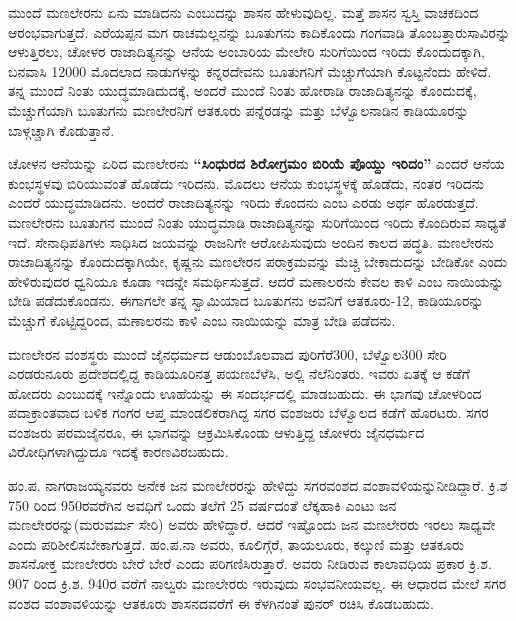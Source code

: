 ಮುಂದೆ ಮಣಲೇರನು ಏನು ಮಾಡಿದನು ಎಂಬುದನ್ನು ಶಾಸನ ಹೇಳುವುದಿಲ್ಲ. ಮತ್ತೆ ಶಾಸನ ಸ್ವಸ್ತಿ ವಾಚಕದಿಂದ ಆರಂಭವಾಗುತ್ತದೆ. ಎರೆಯಪ್ಪನ ಮಗ ರಾಚಮಲ್ಲನನ್ನು ಬೂತುಗನು ಕಾದಿಕೊಂದು ಗಂಗವಾಡಿ ತೊಂಬತ್ತಾರುಸಾವಿರನ್ನು ಆಳುತ್ತಿರಲು, ಚೋಳರ ರಾಜಾದಿತ್ಯನನ್ನು ಆನೆಯ ಅಂಬಾರಿಯ ಮೇಲೇರಿ ಸುರಿಗೆಯಿಂದ ಇರಿದು ಕೊಂದುದಕ್ಕಾಗಿ, ಬನವಾಸಿ 12000 ಮೊದಲಾದ ನಾಡುಗಳನ್ನು ಕನ್ನರದೇವನು ಬೂತುಗನಿಗೆ ಮೆಚ್ಚುಗೆಯಾಗಿ ಕೊಟ್ಟನೆಂದು ಹೇಳಿದೆ. ತನ್ನ ಮುಂದೆ ನಿಂತು ಯುದ್ಧಮಾಡಿದುದಕ್ಕೆ, ಅಂದರೆ ಮುಂದೆ ನಿಂತು ಹೋರಾಡಿ ರಾಜಾದಿತ್ಯನನ್ನು ಕೊಂದುದಕ್ಕೆ, ಮೆಚ್ಚುಗೆಯಾಗಿ ಬೂತುಗನು ಮಣಲೇರನಿಗೆ ಆತಕೂರು ಪನ್ನೆರಡನ್ನು ಮತ್ತು ಬೆಳ್ವೊಲನಾಡಿನ ಕಾಡಿಯೂರನ್ನು ಬಾಳ್ಗಚ್ಚಾಗಿ ಕೊಡುತ್ತಾನೆ.

ಚೋಳನ ಆನೆಯನ್ನು ಏರಿದ ಮಣಲೇರನು \textbf{“ಸಿಂಧುರದ ಶಿರೋಗ್ರಮಂ ಬಿರಿಯೆ ಪೊಯ್ದು ಇರಿದಂ”} ಎಂದರೆ ಆನೆಯ ಕುಂಭಸ್ಥಳವು ಬಿರಿಯುವಂತೆ ಹೊಡೆದು ಇರಿದನು. ಮೊದಲು ಆನೆಯ ಕುಂಭಸ್ಥಳಕ್ಕೆ ಹೊಡೆದು, ನಂತರ ಇರಿದನು ಎಂದರೆ ಯುದ್ಧಮಾಡಿದನು. ಅಂದರೆ ರಾಜಾದಿತ್ಯನನ್ನು ಇರಿದು ಕೊಂದನು ಎಂಬ ಎರಡು ಅರ್ಥ ಹೊರಡುತ್ತದೆ. ಮಣಲೇರನು ಬೂತುಗನ ಮುಂದೆ ನಿಂತು ಯುದ್ಧಮಾಡಿ ರಾಜಾದಿತ್ಯನನ್ನು ಸುರಿಗೆಯಿಂದ ಇರಿದು ಕೊಂದಿರುವ ಸಾಧ್ಯತೆ ಇದೆ. ಸೇನಾಧಿಪತಿಗಳು ಸಾಧಿಸಿದ ಜಯವನ್ನು ರಾಜನಿಗೇ ಆರೋಪಿಸುವುದು ಅಂದಿನ ಕಾಲದ ಪದ್ಧತಿ. ಮಣಲೇರನು ರಾಜಾದಿತ್ಯನನ್ನು ಕೊಂದುದಕ್ಕಾಗಿಯೇ, ಕೃಷ್ಣನು ಮಣಲೇರನ ಪರಾಕ್ರಮವನ್ನು ಮೆಚ್ಚಿ ಬೇಕಾದುದನ್ನು ಬೇಡಿಕೋ ಎಂದು ಹೇಳಿರುವುದರ ಧ್ವನಿಯೂ ಕೂಡಾ ಇದನ್ನೇ ಸಮರ್ಥಿಸುತ್ತದೆ. ಆದರೆ ಮಣಾಲರನು ಕೇವಲ ಕಾಳಿ ಎಂಬ ನಾಯಿಯನ್ನು ಬೇಡಿ ಪಡೆದುಕೊಂಡನು. ಈಗಾಗಲೇ ತನ್ನ ಸ್ವಾಮಿಯಾದ ಬೂತುಗನು ಅವನಿಗೆ ಆತಕೂರು-12, ಕಾಡಿಯೂರನ್ನು ಮೆಚ್ಚುಗೆ ಕೊಟ್ಟಿದ್ದರಿಂದ, ಮಣಾಲರನು ಕಾಳಿ ಎಂಬ ನಾಯಿಯನ್ನು ಮಾತ್ರ ಬೇಡಿ ಪಡೆದನು.

ಮಣಲೇರನ ವಂಶಸ್ಥರು ಮುಂದೆ ಜೈನಧರ್ಮದ ಆಡುಂಬೊಲವಾದ ಪುರಿಗೆರೆ\enginline{-}300, ಬೆಳ್ವೊಲ\enginline{-}300 ಸೇರಿ ಎರಡರುನೂರು ಪ್ರದೇಶದಲ್ಲಿದ್ದ ಕಾಡಿಯೂರಿನತ್ತ ಪಯಣಬೆಳೆಸಿ, ಅಲ್ಲಿ ನೆಲೆನಿಂತರು. ಇವರು ಏತಕ್ಕೆ ಆ ಕಡೆಗೆ ಹೋದರು ಎಂಬುದಕ್ಕೆ ಇನ್ನೊಂದು ಊಹೆಯನ್ನು ಈ ಸಂದರ್ಭದಲ್ಲಿ ಮಾಡಬಹುದು. ಈ ಭಾಗವು ಚೋಳರಿಂದ ಪದಾಕ್ರಾಂತವಾದ ಬಳಿಕ ಗಂಗರ ಆಪ್ತ ಮಾಂಡಲಿಕರಾಗಿದ್ದ ಸಗರ ವಂಶಜರು ಬೆಳ್ವೊಲದ ಕಡೆಗೆ ಹೊರಟರು. ಸಗರ ವಂಶಜರು ಪರಮಜೈನರೂ, ಈ ಭಾಗವನ್ನು ಆಕ್ರಮಿಸಿಕೊಂಡು ಆಳುತ್ತಿದ್ದ ಚೋಳರು ಜೈನಧರ್ಮದ ವಿರೋಧಿಗಳಾಗಿದ್ದುದೂ ಇದಕ್ಕೆ ಕಾರಣವಿರಬಹುದು.

ಹಂ.ಪ. ನಾಗರಾಜಯ್ಯನವರು ಅನೇಕ ಜನ ಮಣಲೇರರನ್ನು ಹೇಳಿದ್ದು ಸಗರವಂಶದ ವಂಶಾವಳಿಯನ್ನು\break ನೀಡಿದ್ದಾರೆ. ಕ್ರಿ.ಶ 750 ರಿಂದ 950ರವರೆಗಿನ ಅವಧಿಗೆ ಒಂದು ತಲೆಗೆ 25 ವರ್ಷದಂತೆ ಲೆಕ್ಕಹಾಕಿ ಎಂಟು ಜನ ಮಣಲೇರರನ್ನು(ಮರುವರ್ಮ ಸೇರಿ) ಅವರು ಹೇಳಿದ್ದಾರೆ. ಆದರೆ ಇಷ್ಟೊಂದು ಜನ ಮಣಲೇರರು ಇರಲು ಸಾಧ್ಯವೇ ಎಂದು ಪರಿಶೀಲಿಸಬೇಕಾಗುತ್ತದೆ. ಹಂ.ಪ.ನಾ ಅವರು, ಕೂಲಿಗ್ಗೆರೆ, ತಾಯಲೂರು, ಕಲ್ಕುಣಿ ಮತ್ತು ಆತಕೂರು ಶಾಸನೋಕ್ತ ಮಣಲೇರರು ಬೇರೆ ಬೇರೆ ಎಂದು ಪರಿಗಣಿಸಿರುತ್ತಾರೆ. ಅವರು ನೀಡಿರುವ ಕಾಲಾವಧಿಯ ಪ್ರಕಾರ ಕ್ರಿ.ಶ. 907 ರಿಂದ ಕ್ರಿ.ಶ. 940ರ ವರೆಗೆ ನಾಲ್ವರು ಮಣಲೇರರು ಇರುವುದು ಸಂಭವನೀಯವಲ್ಲ. ಈ ಆಧಾರದ ಮೇಲೆ ಸಗರ ವಂಶದ ವಂಶಾವಳಿಯನ್ನು ಆತಕೂರು ಶಾಸನದವರೆಗೆ ಈ ಕೆಳಗಿನಂತೆ ಪುನರ್ ರಚಿಸಿ ಕೊಡಬಹುದು.

